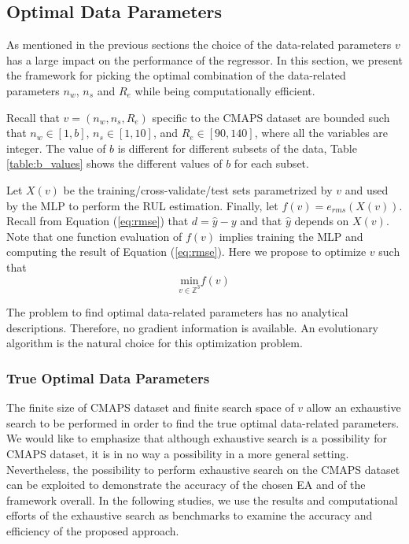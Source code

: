 \documentclass[12pt]{IEEEtran}%
\begin{document}
\subsection{Optimal Data Parameters}

\label{sec:otimal_data_params}

As mentioned in the previous sections the choice of the data-related
parameters $v$ has a large impact on the performance of the regressor. In this
section, we present the framework for picking the optimal combination of the
data-related parameters $n_{w}$, $n_{s}$ and $R_{e}$ while being
computationally efficient.

Recall that $v = (n_{w}, n_{s}, R_{e})$ specific to the CMAPS dataset are
bounded such that $n_{w} \in\left[  1, b\right]  $, $n_{s} \in\left[  1,
10\right]  $, and $R_{e} \in\left[  90, 140 \right]  $, where all the
variables are integer. The value of $b$ is different for different subsets of
the data, Table \ref{table:b_values} shows the different values of $b$ for
each subset.

Let $X(v)$ be the training/cross-validate/test sets parametrized by $v$ and
used by the MLP to perform the RUL estimation. Finally, let $f(v)=e_{rms}%
(X(v))$. Recall from Equation (\ref{eq:rmse}) that $d = \hat{y} - y$ and that
$\hat{y}$ depends on $X(v)$. Note that one function evaluation of $f(v)$
implies training the MLP and computing the result of Equation (\ref{eq:rmse}).
Here we propose to optimize $v$ such that
\begin{equation}
\underset{v \in\mathbb{Z}^{3}}{\mathrm{min}} f(v)
\label{eq:optimization_problem}%
\end{equation}


The problem to find optimal data-related parameters has no analytical
descriptions. Therefore, no gradient information is available. An evolutionary
algorithm is the natural choice for this optimization problem.

\subsubsection{True Optimal Data Parameters}

The finite size of CMAPS dataset and finite search space 
of $v$ allow an exhaustive
search to be performed in order to find the true optimal data-related
parameters. We would like to emphasize that although exhaustive search is a
possibility for CMAPS dataset, it is in no way a possibility in a more general
setting. Nevertheless, the possibility to perform exhaustive search on the
CMAPS dataset can be exploited to demonstrate the accuracy of the chosen EA
and of the framework overall. In the following studies, we use the results and
computational efforts of the exhaustive search as benchmarks to examine the
accuracy and efficiency of the proposed approach.
\end{document}

